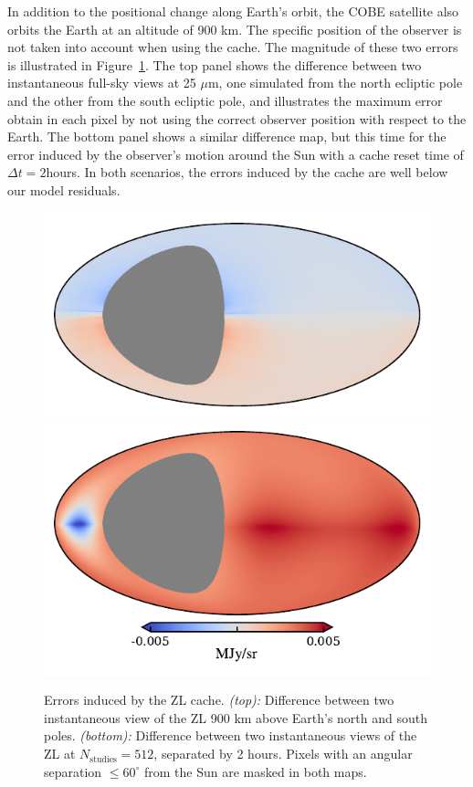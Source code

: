 \documentclass[twocolumn]{aa}
\begin{document}
In addition to the positional change along Earth's orbit, the COBE satellite also orbits the Earth at an altitude of 900 km. The specific position of the observer is not taken into account when using the cache. The magnitude of these two errors is illustrated in Figure~\ref{fig:cache-error}. The top panel shows the difference between two instantaneous full-sky views at 25 $\mu$m, one simulated from the north ecliptic pole and the other from the south ecliptic pole, and illustrates the maximum error obtain in each pixel by not using the correct observer position with respect to the Earth. The bottom panel shows a similar difference map, but this time for the error induced by the observer's motion around the Sun with a cache reset time of $\Delta t = 2$hours. In both scenarios, the errors induced by the cache are well below our model residuals.
\begin{figure}
    \includegraphics[width=\columnwidth]{figs/cache_error_delta_t.pdf}
    \includegraphics[width=\columnwidth]{figs/cache_error_z.pdf}
    \caption{Errors induced by the ZL cache. \textit{(top):} Difference between two 
    instantaneous view of the ZL 900 km above Earth's north and south 
    poles. \textit{(bottom):} Difference between two instantaneous views of the ZL at $N_\mathrm{studies}=512$, 
    separated by 2 hours. Pixels with an angular separation $\leq 60^\circ$ from the Sun 
    are masked in both maps.}
    \label{fig:cache-error}
\end{figure}
\end{document}
